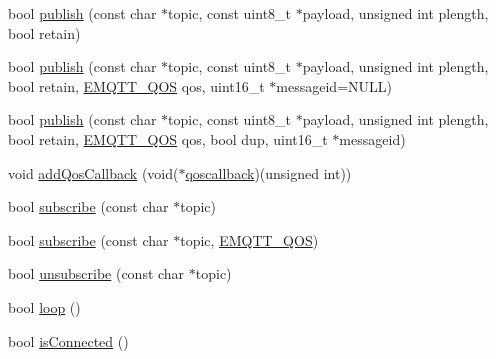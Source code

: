 \begin{DoxyCompactItemize}
\item 
bool \hyperlink{class_m_q_t_t_ac827a753cde9ed29783dc60092990072}{publish} (const char $\ast$topic, const uint8\+\_\+t $\ast$payload, unsigned int plength, bool retain)
\item 
bool \hyperlink{class_m_q_t_t_a12d6e2ff5b2aadb36e2fd7abed4fa46b}{publish} (const char $\ast$topic, const uint8\+\_\+t $\ast$payload, unsigned int plength, bool retain, \hyperlink{class_m_q_t_t_aff501e08e20ebf26b3272fcc0e7215ff}{E\+M\+Q\+T\+T\+\_\+\+Q\+OS} qos, uint16\+\_\+t $\ast$messageid=N\+U\+LL)
\item 
bool \hyperlink{class_m_q_t_t_a11b8368945d62d46acf4e7d41c57e3c3}{publish} (const char $\ast$topic, const uint8\+\_\+t $\ast$payload, unsigned int plength, bool retain, \hyperlink{class_m_q_t_t_aff501e08e20ebf26b3272fcc0e7215ff}{E\+M\+Q\+T\+T\+\_\+\+Q\+OS} qos, bool dup, uint16\+\_\+t $\ast$messageid)
\item 
void \hyperlink{class_m_q_t_t_a324c79ef8a1bfaf03d7b3e73b957283b}{add\+Qos\+Callback} (void($\ast$\hyperlink{class_m_q_t_t_a3b5999625aa19e5198896195b5b5149c}{qoscallback})(unsigned int))
\item 
bool \hyperlink{class_m_q_t_t_aad37921199d922122e1d390883ab6591}{subscribe} (const char $\ast$topic)
\item 
bool \hyperlink{class_m_q_t_t_ac619e73524dcc0aa2c70ae160d7b6689}{subscribe} (const char $\ast$topic, \hyperlink{class_m_q_t_t_aff501e08e20ebf26b3272fcc0e7215ff}{E\+M\+Q\+T\+T\+\_\+\+Q\+OS})
\item 
bool \hyperlink{class_m_q_t_t_a70bfce6554c3d08f7a0e174d23a8b642}{unsubscribe} (const char $\ast$topic)
\item 
bool \hyperlink{class_m_q_t_t_a5f9624e440c99d7ec0fb0a8c1a30d064}{loop} ()
\item 
bool \hyperlink{class_m_q_t_t_a57a5231fd3205682c56de70e57dd9d62}{is\+Connected} ()
\end{DoxyCompactItemize}
